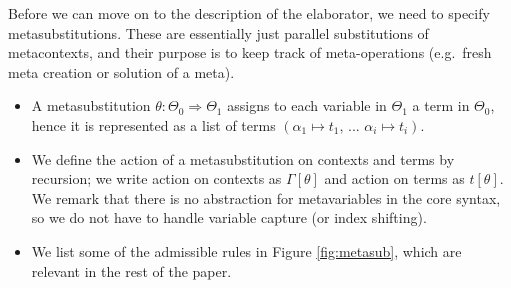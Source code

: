 \documentclass[acmsmall,screen,dvipsnames]{acmart}\settopmatter{}
\newcommand{\To}{\Rightarrow}
\theoremstyle{remark}
\begin{document}
Before we can move on to the description of the elaborator, we need to specify
metasubstitutions. These are essentially just parallel substitutions of
metacontexts, and their purpose is to keep track of meta-operations (e.g.\ fresh
meta creation or solution of a meta).

\begin{itemize}
  \item
    A metasubstitution $\theta : \Theta_0 \To \Theta_1$ assigns to each variable
    in $\Theta_1$ a term in $\Theta_0$, hence it is represented as a list of
    terms $(\alpha_1 \mapsto t_1,\,...\,\,\alpha_i \mapsto t_i)$.
  \item
    We define the action of a metasubstitution on contexts and terms by
    recursion; we write action on contexts as $\Gamma[\theta]$ and action on
    terms as $t[\theta]$. We remark that there is no abstraction for
    metavariables in the core syntax, so we do not have to handle variable
    capture (or index shifting).
  \item
    We list some of the admissible rules in Figure \ref{fig:metasub}, which
    are relevant in the rest of the paper.
\end{itemize}
\end{document}

